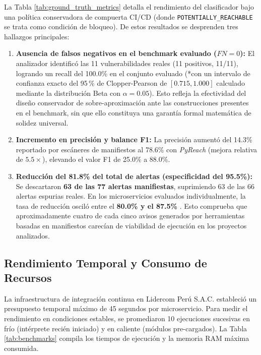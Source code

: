 \documentclass[conference]{IEEEtran}
\begin{document}
La Tabla \ref{tab:ground_truth_metrics} detalla el rendimiento del clasificador bajo una política conservadora de compuerta CI/CD (donde \texttt{POTENTIALLY\_REACHABLE} se trata como condición de bloqueo). De estos resultados se desprenden tres hallazgos principales:
\begin{enumerate}
    \item \textbf{Ausencia de falsos negativos en el benchmark evaluado ($FN = 0$):} El analizador identificó las 11 vulnerabilidades reales (11 positivos, 11/11), logrando un recall del 100.0\% en el conjunto evaluado (*con un intervalo de confianza exacto del 95\,\% de Clopper-Pearson de $[0.715, 1.000]$ calculado mediante la distribución Beta con $\alpha=0.05$). Esto refleja la efectividad del diseño conservador de sobre-aproximación ante las construcciones presentes en el benchmark, sin que ello constituya una garantía formal matemática de solidez universal.
    \item \textbf{Incremento en precisión y balance F1:} La precisión aumentó del 14.3\% reportado por escáneres de manifiestos al 78.6\% con \textit{PyReach} (mejora relativa de $5.5\times$), elevando el valor F1 de 25.0\% a 88.0\%.
    \item \textbf{Reducción del 81.8\% del total de alertas (especificidad del 95.5\%):} Se descartaron \textbf{63 de las 77 alertas manifiestas}, suprimiendo 63 de las 66 alertas espurias reales. En los microservicios evaluados individualmente, la tasa de reducción osciló entre el \textbf{80.0\% y el 87.5\%} . Esto comprueba que aproximadamente cuatro de cada cinco avisos generados por herramientas basadas en manifiestos carecían de viabilidad de ejecución en los proyectos analizados.
\end{enumerate}

\subsection{Rendimiento Temporal y Consumo de Recursos}
La infraestructura de integración continua en Lidercom Perú S.A.C. estableció un presupuesto temporal máximo de 45 segundos por microservicio. Para medir el rendimiento en condiciones estables, se promediaron 10 ejecuciones sucesivas en frío (intérprete recién iniciado) y en caliente (módulos pre-cargados). La Tabla \ref{tab:benchmarks} compila los tiempos de ejecución y la memoria RAM máxima consumida.
\end{document}
